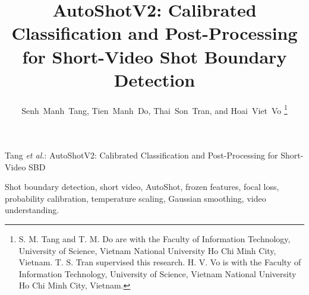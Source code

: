 \documentclass[journal]{IEEEtran}
\begin{document}
\title{AutoShotV2: Calibrated Classification and Post-Processing for Short-Video Shot Boundary Detection}

\author{Senh~Manh~Tang, Tien~Manh~Do, Thai~Son~Tran, and Hoai~Viet~Vo%
\thanks{S. M. Tang and T. M. Do are with the Faculty of Information Technology,
University of Science, Vietnam National University Ho Chi Minh City, Vietnam.
T. S. Tran supervised this research.
H. V. Vo is with the Faculty of Information Technology,
University of Science, Vietnam National University Ho Chi Minh City, Vietnam.}}

%
{Tang \MakeLowercase{\textit{et al.}}: AutoShotV2: Calibrated Classification and Post-Processing for Short-Video SBD}

\maketitle



\begin{IEEEkeywords}
Shot boundary detection, short video, AutoShot, frozen features, focal loss, probability calibration, temperature scaling, Gaussian smoothing, video understanding.
\end{IEEEkeywords}

\IEEEpeerreviewmaketitle








\ifCLASSOPTIONcaptionsoff
  \newpage
\fi
\end{document}

